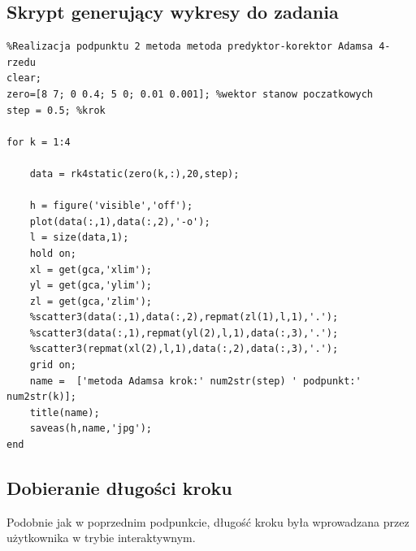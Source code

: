 \documentclass[a4paper, 11pt]{article}
\begin{document}
\subsection{Skrypt generujący wykresy do zadania}
\begin{lstlisting}
%Realizacja podpunktu 2 metoda metoda predyktor-korektor Adamsa 4-rzedu
clear; 
zero=[8 7; 0 0.4; 5 0; 0.01 0.001]; %wektor stanow poczatkowych
step = 0.5; %krok

for k = 1:4
    
    data = rk4static(zero(k,:),20,step);
    
    h = figure('visible','off');
    plot(data(:,1),data(:,2),'-o');
    l = size(data,1);
    hold on;
    xl = get(gca,'xlim');
    yl = get(gca,'ylim');
    zl = get(gca,'zlim');
    %scatter3(data(:,1),data(:,2),repmat(zl(1),l,1),'.');
    %scatter3(data(:,1),repmat(yl(2),l,1),data(:,3),'.');
    %scatter3(repmat(xl(2),l,1),data(:,2),data(:,3),'.');
    grid on; 
    name =  ['metoda Adamsa krok:' num2str(step) ' podpunkt:' num2str(k)];
    title(name);
    saveas(h,name,'jpg'); 
end
\end{lstlisting}

\subsection{Dobieranie długości kroku}
Podobnie jak w poprzednim podpunkcie, długość kroku była wprowadzana przez użytkownika w trybie interaktywnym. 
%
%
%
\end{document}
